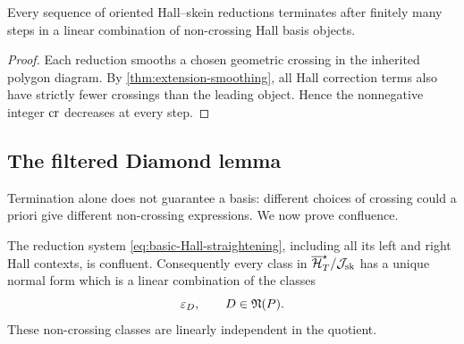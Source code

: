 \begin{lemma}[Termination]
\label{lem:termination}
Every sequence of oriented Hall--skein reductions terminates after finitely
many steps in a linear combination of non-crossing Hall basis objects.
\end{lemma}

\begin{proof}
Each reduction smooths a chosen geometric crossing in the inherited polygon
diagram.  By \cref{thm:extension-smoothing}, all Hall correction terms also
have strictly fewer crossings than the leading object.  Hence the
nonnegative integer $\operatorname{cr}$ decreases at every step.
\end{proof}

\subsection{The filtered Diamond lemma}

Termination alone does not guarantee a basis: different choices of crossing
could a priori give different non-crossing expressions.  We now prove
confluence.

\begin{theorem}
\label{thm:Hall-skein-diamond}
The reduction system \eqref{eq:basic-Hall-straightening}, including all its
left and right Hall contexts, is confluent.  Consequently every class in
$\overline{\mathcal H}_{T}^{\star}/\mathcal J_{\mathrm{sk}}$ has a unique normal form which is a linear combination of the
classes
\[
 \varepsilon_D,
 \qquad D\in\mathfrak N(P).
\]
These non-crossing classes are linearly independent in the quotient.
\end{theorem}

